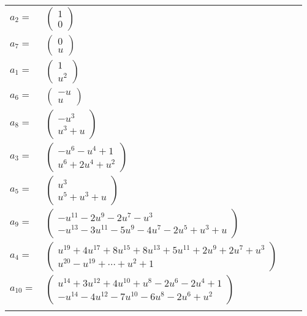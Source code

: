 \documentclass[1p]{elsarticle_modified}
\theoremstyle{definition}
\begin{document}
\begin{tabular}{m{7pt} m{180pt} m{7pt} m{180pt} }
\flushright $a_{2}=$&$\begin{pmatrix}1\\0\end{pmatrix}$ \\
\flushright $a_{7}=$&$\begin{pmatrix}0\\u\end{pmatrix}$ \\
\flushright $a_{1}=$&$\begin{pmatrix}1\\u^2\end{pmatrix}$ \\
\flushright $a_{6}=$&$\begin{pmatrix}- u\\u\end{pmatrix}$ \\
\flushright $a_{8}=$&$\begin{pmatrix}- u^3\\u^3+u\end{pmatrix}$ \\
\flushright $a_{3}=$&$\begin{pmatrix}- u^6- u^4+1\\u^6+2 u^4+u^2\end{pmatrix}$ \\
\flushright $a_{5}=$&$\begin{pmatrix}u^3\\u^5+u^3+u\end{pmatrix}$ \\
\flushright $a_{9}=$&$\begin{pmatrix}- u^{11}-2 u^9-2 u^7- u^3\\- u^{13}-3 u^{11}-5 u^9-4 u^7-2 u^5+u^3+u\end{pmatrix}$ \\
\flushright $a_{4}=$&$\begin{pmatrix}u^{19}+4 u^{17}+8 u^{15}+8 u^{13}+5 u^{11}+2 u^9+2 u^7+u^3\\u^{20}- u^{19}+\cdots+u^2+1\end{pmatrix}$ \\
\flushright $a_{10}=$&$\begin{pmatrix}u^{14}+3 u^{12}+4 u^{10}+u^8-2 u^6-2 u^4+1\\- u^{14}-4 u^{12}-7 u^{10}-6 u^8-2 u^6+u^2\end{pmatrix}$\\&\end{tabular}
\end{document}
